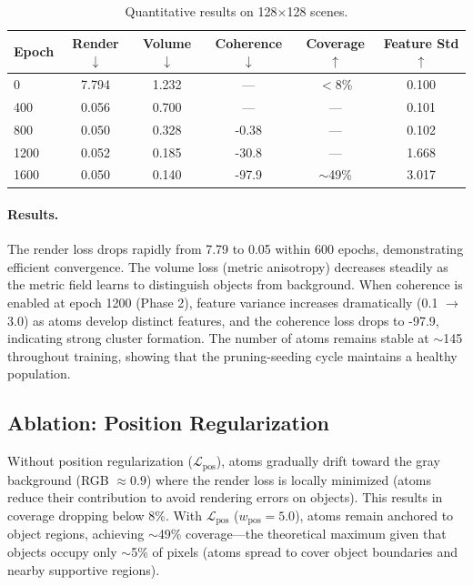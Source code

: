 \documentclass[11pt]{article}
\begin{document}
\begin{table}[h]
\centering
\caption{Quantitative results on 128$\times$128 scenes.}
\label{tab:results}
\begin{tabular}{lccccc}
\toprule
Epoch & Render $\downarrow$ & Volume $\downarrow$ & Coherence $\downarrow$ & Coverage $\uparrow$ & Feature Std $\uparrow$ \\
\midrule
0     & 7.794 & 1.232 & ---   & $<$8\%  & 0.100 \\
400   & 0.056 & 0.700 & ---   & ---     & 0.101 \\
800   & 0.050 & 0.328 & -0.38 & ---     & 0.102 \\
1200  & 0.052 & 0.185 & -30.8 & ---     & 1.668 \\
1600  & 0.050 & 0.140 & -97.9 & $\sim$49\% & 3.017 \\
\bottomrule
\end{tabular}
\end{table}

\paragraph{Results.} The render loss drops rapidly from 7.79 to 0.05 within 600 epochs, demonstrating efficient convergence. The volume loss (metric anisotropy) decreases steadily as the metric field learns to distinguish objects from background. When coherence is enabled at epoch 1200 (Phase 2), feature variance increases dramatically (0.1 $\to$ 3.0) as atoms develop distinct features, and the coherence loss drops to -97.9, indicating strong cluster formation. The number of atoms remains stable at $\sim$145 throughout training, showing that the pruning-seeding cycle maintains a healthy population.

\subsection{Ablation: Position Regularization}

Without position regularization ($\mathcal{L}_{\text{pos}}$), atoms gradually drift toward the gray background (RGB $\approx 0.9$) where the render loss is locally minimized (atoms reduce their contribution to avoid rendering errors on objects). This results in coverage dropping below 8\%. With $\mathcal{L}_{\text{pos}}$ ($w_{\text{pos}} = 5.0$), atoms remain anchored to object regions, achieving $\sim$49\% coverage---the theoretical maximum given that objects occupy only $\sim$5\% of pixels (atoms spread to cover object boundaries and nearby supportive regions).
\end{document}
